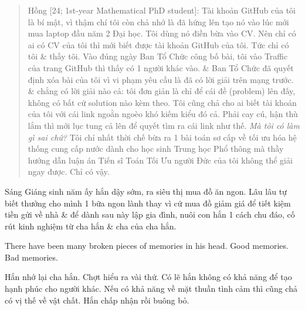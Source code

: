 \documentclass[12pt]{article}
\begin{document}
\begin{quote}
	{\sf Hồng [24; 1st-year Mathematical PhD student]}: Tài khoản GitHub của tôi là bí mật, vì thậm chí tôi còn chả nhớ là đã hứng lên tạo nó vào lúc mới mua laptop đầu năm 2 Đại học. Tôi dùng nó điền bừa vào CV. Nên chỉ có ai có CV của tôi thì mới biết được tài khoản GitHub của tôi. Tức chỉ có tôi \& thầy tôi. Vào đúng ngày Ban Tổ Chức công bố bài, tôi vào Traffic của trang GitHub thì thấy có 1 người khác vào. \& Ban Tổ Chức đã quyết định xóa bài của tôi vì vi phạm yêu cầu là đã có lời giải trên mạng trước. \& chẳng có lời giải nào cả: tôi đơn giản là chỉ để cái đề (problem) lên đấy, không có bất cứ solution nào kèm theo. Tôi cũng chả cho ai biết tài khoản của tôi với cái link ngoằn ngoèo khó kiếm kiểu đó cả. Phải cay cú, hận thù lắm thì mới lục tung cả lên để quyết tìm ra cái link như thế. {\it Mà tôi có làm gì sai chứ?} Tôi chỉ nhất thời chế bừa ra 1 bài toán sơ cấp về tối ưu hóa hệ thống cung cấp nước dành cho học sinh Trung học Phổ thông mà thầy hướng dẫn luận án Tiến sĩ Toán Tối Ưu người Đức của tôi không thể giải ngay được. Chỉ có vậy.
\end{quote}
Sáng Giáng sinh năm ấy hắn dậy sớm, ra siêu thị mua đồ ăn ngon. Lâu lâu tự  biết thưởng cho mình 1 bữa ngon lành thay vì cứ mua đồ giảm giá để tiết kiệm tiền gửi về nhà \& để dành sau này lập gia đình, nuôi con hắn 1 cách chu đáo, cố rút kinh nghiệm từ cha hắn \& cha của cha hắn. 

There have been many broken pieces of memories in his head. Good memories. Bad memories.

Hắn nhớ lại cha hắn. Chợt hiểu ra vài thứ. Có lẽ hắn không có khả năng để tạo hạnh phúc cho người khác. Nếu có khả năng về mặt thuần tình cảm thì cũng chả có vị thế về vật chất. Hắn chấp nhận rồi buông bỏ.
\end{document}
